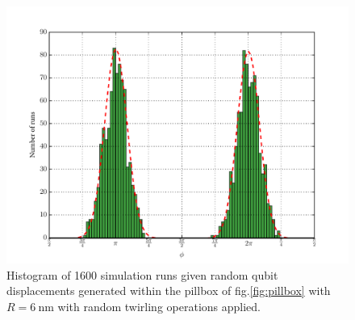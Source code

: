 \begin{figure}
	\centering
	\includegraphics[width=\columnwidth]{../Figures/Displacement_Histogram.pdf}	
	\caption{Histogram of 1600 simulation runs given random qubit displacements generated within the pillbox of fig.\@ \ref{fig:pillbox} with $R = \SI{6}{\nano\metre}$ with random twirling operations applied. }
	\label{fig:DisplacementHistogram}
\end{figure}